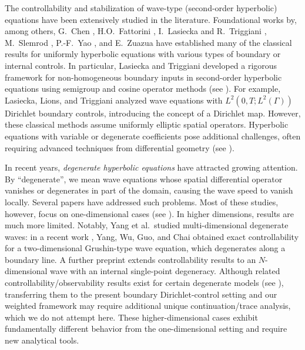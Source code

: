 \documentclass[preprint,12pt]{elsarticle}
\theoremstyle{definition}   %
\numberwithin{equation}{section}
\begin{document}
The controllability and stabilization of wave-type (second-order hyperbolic) equations have been extensively studied in the literature. Foundational works by, among others, G.~Chen \cite{Chen1, Chen2}, H.O.~Fattorini \cite{Fattorini1}, I.~Lasiecka and R.~Triggiani \cite{Lasiecka,Lasiecka1,Lasiecka2,Lasiecka3}, M.~Slemrod \cite{Slemrod}, P.-F.~Yao \cite{Yao}, and E.~Zuazua \cite{Zuazua} have established many of the classical results for uniformly hyperbolic equations with various types of boundary or internal controls. In particular, Lasiecka and Triggiani developed a rigorous framework for non-homogeneous boundary inputs in second-order hyperbolic equations using semigroup and cosine operator methods (see \cite{Lasiecka1,Lasiecka2}). For example, Lasiecka, Lions, and Triggiani \cite{Lasiecka1} analyzed wave equations with $L^2(0,T;L^2(\Gamma))$ Dirichlet boundary controls, introducing the concept of a Dirichlet map. However, these classical methods assume uniformly elliptic spatial operators. Hyperbolic equations with variable or degenerate coefficients pose additional challenges, often requiring advanced techniques from differential geometry (see \cite{Lasiecka3,Yao}).

In recent years, \emph{degenerate hyperbolic equations} have attracted growing attention. By ``degenerate'', we mean wave equations whose spatial differential operator vanishes or degenerates in part of the domain, causing the wave speed to vanish locally. Several papers have addressed such problems. Most of these studies, however, focus on one-dimensional cases (see \cite{Cannarsa1,Fragnelli,Gueye,Gao}). In higher dimensions, results are much more limited. Notably, Yang et al.\ studied multi-dimensional degenerate waves: in a recent work \cite{Yang}, Yang, Wu, Guo, and Chai obtained exact controllability for a two-dimensional Grushin-type wave equation, which degenerates along a boundary line. A further preprint \cite{Yang1} extends controllability results to an $N$-dimensional wave with an internal single-point degeneracy. Although related controllability/observability results exist for certain degenerate models (see \cite{Yang,Yang1}), transferring them to the present boundary Dirichlet-control setting and our weighted framework may require additional unique continuation/trace analysis, which we do not attempt here. These higher-dimensional cases exhibit fundamentally different behavior from the one-dimensional setting and require new analytical tools.
\end{document}
